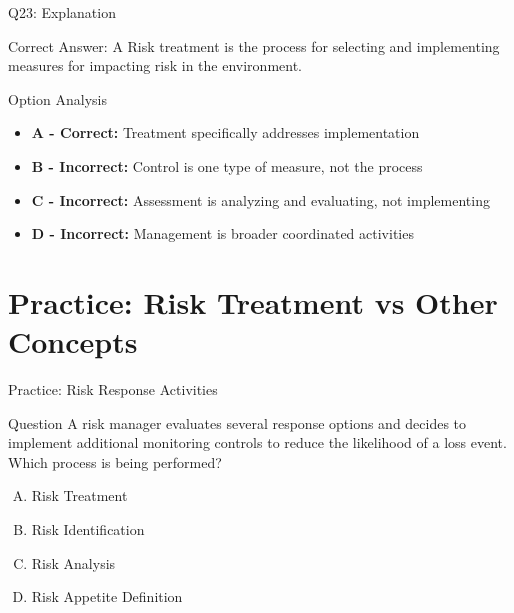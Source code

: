 \documentclass{beamer}
\begin{document}
	\begin{frame}{Q23: Explanation}
		\begin{block}{Correct Answer: A}
			Risk treatment is the process for selecting and implementing measures for impacting risk in the environment.
		\end{block}
		\begin{block}{Option Analysis}
			\begin{itemize}
				\item \textbf{A - Correct:} Treatment specifically addresses implementation
				\item \textbf{B - Incorrect:} Control is one type of measure, not the process
				\item \textbf{C - Incorrect:} Assessment is analyzing and evaluating, not implementing
				\item \textbf{D - Incorrect:} Management is broader coordinated activities
			\end{itemize}
		\end{block}
	\end{frame}
	
	
	
	
	\section{Practice: Risk Treatment vs Other Concepts}
	
	\begin{frame}{Practice: Risk Response Activities}
		\begin{block}{Question}
			A risk manager evaluates several response options and decides to implement additional monitoring controls to reduce the likelihood of a loss event. Which process is being performed?
		\end{block}
		\begin{enumerate}[(A)]
			\item Risk Treatment
			\item Risk Identification
			\item Risk Analysis
			\item Risk Appetite Definition
		\end{enumerate}
	\end{frame}
	
\end{document}
